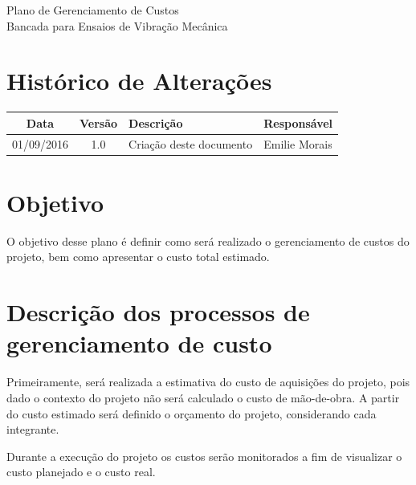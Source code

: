 \begin{apendicesenv}

\begin{center}
 {\large Plano de Gerenciamento de Custos}\\[0.2cm]
 {Bancada para Ensaios de Vibração Mecânica}\\
 \end{center}
 
 \section*{Histórico de Alterações}
\begin{table}[h]
\centering
\begin{tabular}{|c|c|p{6cm}|p{5cm}|}

Data & Versão & Descrição & Responsável\\
\hline                               
01/09/2016 & 1.0 & Criação deste documento & Emilie Morais\\ \hline
\end{tabular}
\end{table}

\section*{Objetivo}
  O objetivo desse plano é definir como será realizado o gerenciamento de custos do projeto, bem como apresentar o custo total estimado.

  
\section*{Descrição dos processos de gerenciamento de custo}

Primeiramente, será realizada a estimativa do custo de aquisições do projeto, pois dado o contexto do projeto não será calculado o custo de mão-de-obra. A partir do custo estimado será definido o orçamento do projeto, considerando cada integrante.

Durante a execução do projeto os custos serão monitorados a fim de visualizar o custo planejado e o custo real.




\end{apendicesenv}
